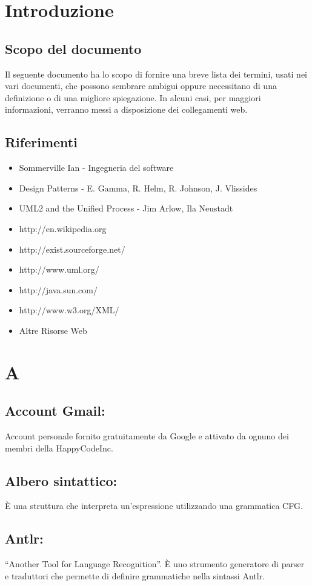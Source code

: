 \chapter{Introduzione}
\section{Scopo del documento}
Il seguente documento ha lo scopo di fornire una breve lista dei termini, usati nei vari documenti, che possono sembrare ambigui oppure necessitano di una definizione o di una migliore spiegazione. In alcuni casi, per maggiori informazioni, verranno messi a disposizione dei collegamenti web.
\section{Riferimenti}
\begin{itemize}
\item Sommerville Ian - Ingegneria del software
\item Design Patterns - E. Gamma, R. Helm, R. Johnson, J. Vlissides
\item UML2 and the Unified Process - Jim Arlow, Ila Neustadt
\item http://en.wikipedia.org
\item http://exist.sourceforge.net/
\item http://www.uml.org/
\item http://java.sun.com/
\item http://www.w3.org/XML/
\item Altre Risorse Web


\end{itemize}
\chapter{A}
\section{Account Gmail:}
Account personale fornito gratuitamente da Google e attivato da ognuno dei membri della HappyCodeInc.
\section{Albero sintattico:}
\`E una struttura che interpreta un'espressione utilizzando una grammatica CFG.
\section{Antlr:}
``Another Tool for Language Recognition''. \`E uno strumento generatore di parser e traduttori che permette di definire grammatiche nella sintassi Antlr.
